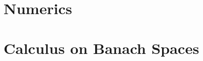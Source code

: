 \documentclass[final]{nddiss2e}
\begin{document}
\tableofcontents




\mainmatter
 
 
 
 \chapter{Numerics}
\appendix
\chapter{Calculus on Banach Spaces}

\end{document}
